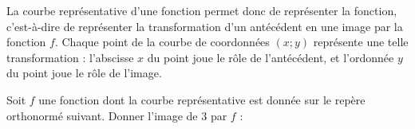\documentclass{article}
\begin{document}
\begin{remark}
La courbe représentative d'une fonction permet donc de représenter la fonction, c'est-à-dire de représenter la transformation d'un antécédent en une image par la fonction $f$. Chaque point de la courbe de coordonnées $(x;y)$ représente une telle transformation : l'abscisse $x$ du point joue le rôle de l'antécédent, et l'ordonnée $y$ du point joue le rôle de l'image.
\end{remark}
\begin{example}
Soit $f$ une fonction dont la courbe représentative est donnée sur le repère orthonormé suivant. Donner l'image de $3$ par $f$ : \answersline
\begin{center}
\end{center}
\end{example}
\end{document}

